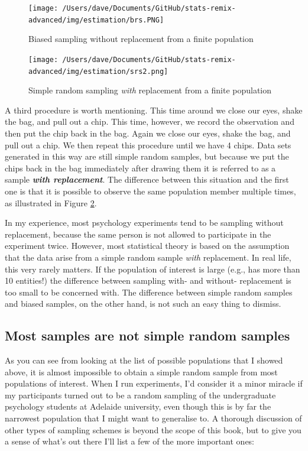 \documentclass[
]{book}
\begin{document}
\begin{figure}
\centering
\texttt{[image: /Users/dave/Documents/GitHub/stats-remix-advanced/img/estimation/brs.PNG]}
\caption{\label{fig:brs}Biased sampling without replacement from a finite population}
\end{figure}

\begin{figure}
\centering
\texttt{[image: /Users/dave/Documents/GitHub/stats-remix-advanced/img/estimation/srs2.png]}
\caption{\label{fig:srs2}Simple random sampling \emph{with} replacement from a finite population}
\end{figure}

A third procedure is worth mentioning. This time around we close our eyes, shake the bag, and pull out a chip. This time, however, we record the observation and then put the chip back in the bag. Again we close our eyes, shake the bag, and pull out a chip. We then repeat this procedure until we have 4 chips. Data sets generated in this way are still simple random samples, but because we put the chips back in the bag immediately after drawing them it is referred to as a sample \textbf{\emph{with replacement}}. The difference between this situation and the first one is that it is possible to observe the same population member multiple times, as illustrated in Figure \ref{fig:srs2}.

In my experience, most psychology experiments tend to be sampling without replacement, because the same person is not allowed to participate in the experiment twice. However, most statistical theory is based on the assumption that the data arise from a simple random sample \emph{with} replacement. In real life, this very rarely matters. If the population of interest is large (e.g., has more than 10 entities!) the difference between sampling with- and without- replacement is too small to be concerned with. The difference between simple random samples and biased samples, on the other hand, is not such an easy thing to dismiss.

\hypertarget{most-samples-are-not-simple-random-samples}{%
\subsection{Most samples are not simple random samples}\label{most-samples-are-not-simple-random-samples}}

As you can see from looking at the list of possible populations that I showed above, it is almost impossible to obtain a simple random sample from most populations of interest. When I run experiments, I'd consider it a minor miracle if my participants turned out to be a random sampling of the undergraduate psychology students at Adelaide university, even though this is by far the narrowest population that I might want to generalise to. A thorough discussion of other types of sampling schemes is beyond the scope of this book, but to give you a sense of what's out there I'll list a few of the more important ones:
\end{document}
